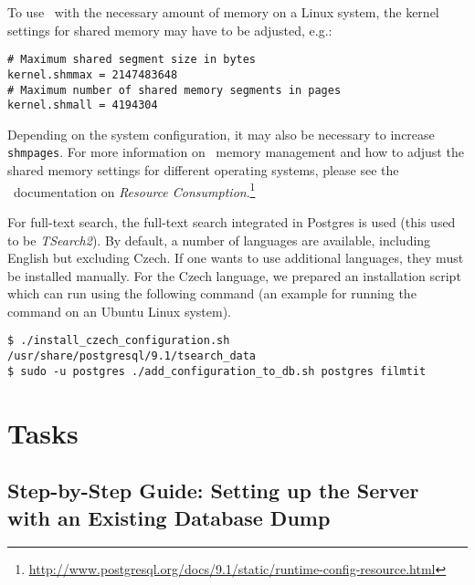 To use \postgres~with the necessary amount of memory on a Linux system, the kernel settings for shared memory may have to be adjusted, e.g.:

\vspace*{0.5em}
\begin{lstlisting}
# Maximum shared segment size in bytes
kernel.shmmax = 2147483648
# Maximum number of shared memory segments in pages
kernel.shmall = 4194304
\end{lstlisting}
\vspace*{0.5em}

Depending on the system configuration, it may also be necessary to increase {\tt shmpages}. For more information on \postgres~memory management and how to adjust the shared memory settings for different operating systems, please see the \postgres~documentation on \emph{Resource Consumption}.\footnote{\url{http://www.postgresql.org/docs/9.1/static/runtime-config-resource.html}}

For full-text search, the full-text search integrated in Postgres is used (this used to be \emph{TSearch2}). By default, a  number of languages are available, including English but excluding Czech. If one wants to use additional languages, they must be installed manually. For the Czech language, we prepared an installation script which can run using the following command (an example for running the command on an Ubuntu Linux system).

\vspace*{0.5em}
\begin{lstlisting}
$ ./install_czech_configuration.sh /usr/share/postgresql/9.1/tsearch_data
$ sudo -u postgres ./add_configuration_to_db.sh postgres filmtit
\end{lstlisting}
\vspace*{0.5em}


\section{Tasks}

\subsection{Step-by-Step Guide: Setting up the Server with an Existing Database Dump}

